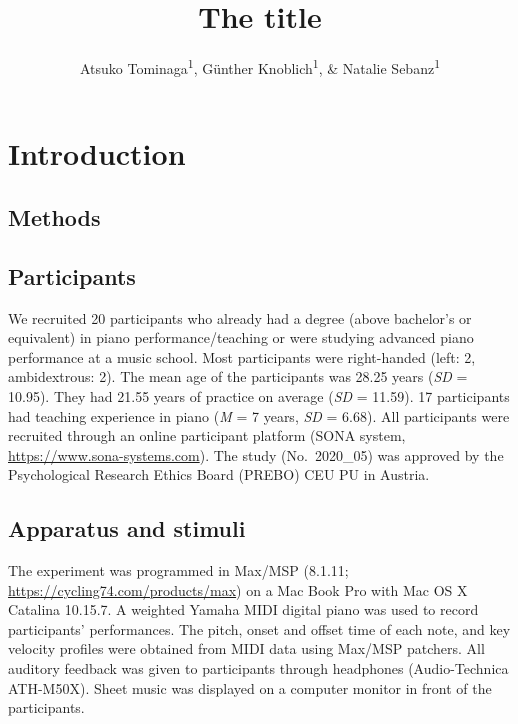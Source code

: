 \documentclass[
  man]{apa6}
\title{The title}
\author{Atsuko Tominaga\textsuperscript{1}, Günther Knoblich\textsuperscript{1}, \& Natalie Sebanz\textsuperscript{1}}
\date{}
\affiliation{\vspace{0.5cm}\textsuperscript{1} Department of Cognitive Science, Central European University}
\begin{document}
\maketitle

\hypertarget{introduction}{%
\section{Introduction}\label{introduction}}

\hypertarget{methods}{%
\subsection{Methods}\label{methods}}

\hypertarget{participants}{%
\subsection{Participants}\label{participants}}

We recruited 20 participants who already had a degree (above bachelor's or equivalent) in piano performance/teaching or were studying advanced piano performance at a music school. Most participants were right-handed (left: 2, ambidextrous: 2). The mean age of the participants was 28.25 years (\emph{SD} = 10.95). They had 21.55 years of practice on average (\emph{SD} = 11.59). 17 participants had teaching experience in piano (\emph{M} = 7 years, \emph{SD} = 6.68). All participants were recruited through an online participant platform (SONA system, \url{https://www.sona-systems.com}). The study (No.~2020\_05) was approved by the Psychological Research Ethics Board (PREBO) CEU PU in Austria.

\hypertarget{apparatus-and-stimuli}{%
\subsection{Apparatus and stimuli}\label{apparatus-and-stimuli}}

The experiment was programmed in Max/MSP (8.1.11; \url{https://cycling74.com/products/max}) on a Mac Book Pro with Mac OS X Catalina 10.15.7. A weighted Yamaha MIDI digital piano was used to record participants' performances. The pitch, onset and offset time of each note, and key velocity profiles were obtained from MIDI data using Max/MSP patchers. All auditory feedback was given to participants through headphones (Audio-Technica ATH-M50X). Sheet music was displayed on a computer monitor in front of the participants.
\end{document}
